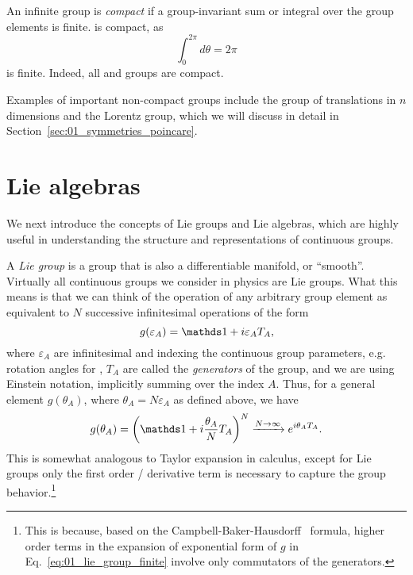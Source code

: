 \begin{definition}
\label{def:01_compact}
An infinite group is \textit{compact} if a group-invariant sum or integral over the group elements is finite.
\UU[1] is compact, as
\begin{equation}
	\label{eq:01_u1_integral}
	\int_0^{2\pi} d\theta = 2\pi
\end{equation}
is finite.
Indeed, all \SO[n] and \SU[n] groups are compact.
\end{definition}

Examples of important non-compact groups include the group of translations in $n$ dimensions and the Lorentz group, which we will discuss in detail in Section~\ref{sec:01_symmetries_poincare}.

\section{Lie algebras}
\label{sec:01_symmetries_lie}

We next introduce the concepts of Lie groups and Lie algebras, which are highly useful in understanding the structure and representations of continuous groups.

\begin{definition}
\label{def:01_lie_group}
A \textit{Lie group} is a group that is also a differentiable manifold, or ``smooth''.
Virtually all continuous groups we consider in physics are Lie groups.
What this means is that we can think of the operation of any arbitrary group element as equivalent to $N$ successive infinitesimal operations of the form
\begin{equation}
	\label{eq:01_lie_group_infinitesimal}
	g(\varepsilon_A) = \identity + i \varepsilon_A T_A,
\end{equation}
where $\varepsilon_A$ are infinitesimal and indexing the continuous group parameters, e.g. rotation angles for \SO[n], $T_A$ are called the \textit{generators} of the group,
and we are using Einstein notation, implicitly summing over the index $A$.
Thus, for a general element $g(\theta_A)$, where $\theta_A = N \varepsilon_A$ as defined above, we have
\begin{equation}
	\label{eq:01_lie_group_finite}
	g(\theta_A) = \left(\identity + i \frac{\theta_A}{N} T_A\right)^N \xrightarrow{N \rightarrow \infty} e^{i\theta_A T_A}.
\end{equation}
This is somewhat analogous to Taylor expansion in calculus, except for Lie groups only the first order / derivative term is necessary to capture the group behavior.\footnote{This is because, based on the Campbell-Baker-Hausdorff~\cite{enwiki:1183926638} formula, higher order terms in the expansion of exponential form of $g$ in Eq.~\ref{eq:01_lie_group_finite} involve only commutators of the generators.}
\end{definition}

